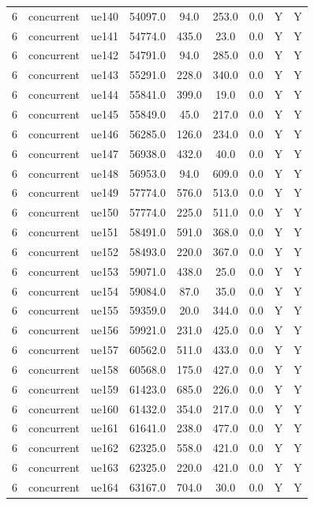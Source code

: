 \begin{table}[ht]
\begin{tabular}{|c|c|c|c|c|c|c|c|c|}
6 & concurrent & ue140 & 54097.0 & 94.0 & 253.0 & 0.0 & Y & Y \\
6 & concurrent & ue141 & 54774.0 & 435.0 & 23.0 & 0.0 & Y & Y \\
6 & concurrent & ue142 & 54791.0 & 94.0 & 285.0 & 0.0 & Y & Y \\
6 & concurrent & ue143 & 55291.0 & 228.0 & 340.0 & 0.0 & Y & Y \\
6 & concurrent & ue144 & 55841.0 & 399.0 & 19.0 & 0.0 & Y & Y \\
6 & concurrent & ue145 & 55849.0 & 45.0 & 217.0 & 0.0 & Y & Y \\
6 & concurrent & ue146 & 56285.0 & 126.0 & 234.0 & 0.0 & Y & Y \\
6 & concurrent & ue147 & 56938.0 & 432.0 & 40.0 & 0.0 & Y & Y \\
6 & concurrent & ue148 & 56953.0 & 94.0 & 609.0 & 0.0 & Y & Y \\
6 & concurrent & ue149 & 57774.0 & 576.0 & 513.0 & 0.0 & Y & Y \\
6 & concurrent & ue150 & 57774.0 & 225.0 & 511.0 & 0.0 & Y & Y \\
6 & concurrent & ue151 & 58491.0 & 591.0 & 368.0 & 0.0 & Y & Y \\
6 & concurrent & ue152 & 58493.0 & 220.0 & 367.0 & 0.0 & Y & Y \\
6 & concurrent & ue153 & 59071.0 & 438.0 & 25.0 & 0.0 & Y & Y \\
6 & concurrent & ue154 & 59084.0 & 87.0 & 35.0 & 0.0 & Y & Y \\
6 & concurrent & ue155 & 59359.0 & 20.0 & 344.0 & 0.0 & Y & Y \\
6 & concurrent & ue156 & 59921.0 & 231.0 & 425.0 & 0.0 & Y & Y \\
6 & concurrent & ue157 & 60562.0 & 511.0 & 433.0 & 0.0 & Y & Y \\
6 & concurrent & ue158 & 60568.0 & 175.0 & 427.0 & 0.0 & Y & Y \\
6 & concurrent & ue159 & 61423.0 & 685.0 & 226.0 & 0.0 & Y & Y \\
6 & concurrent & ue160 & 61432.0 & 354.0 & 217.0 & 0.0 & Y & Y \\
6 & concurrent & ue161 & 61641.0 & 238.0 & 477.0 & 0.0 & Y & Y \\
6 & concurrent & ue162 & 62325.0 & 558.0 & 421.0 & 0.0 & Y & Y \\
6 & concurrent & ue163 & 62325.0 & 220.0 & 421.0 & 0.0 & Y & Y \\
6 & concurrent & ue164 & 63167.0 & 704.0 & 30.0 & 0.0 & Y & Y \\

\end{tabular}
\end{table}
